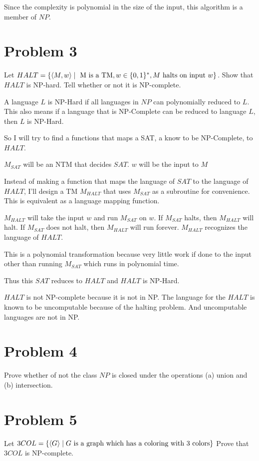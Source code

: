 \documentclass[12pt]{article}
\begin{document}
Since the complexity is polynomial in the size of the input, this algorithm is a member of $NP$.


\section*{Problem 3}
\begin{questionbox}
	Let $HALT = \{ \braket{M, w} \mid \text{ M is a TM}, w \in \{0,1\}^*, M \text { halts on input } w  \}$. Show that $HALT$ is NP-hard. Tell whether or not it is NP-complete.
\end{questionbox}

A language $L$ is NP-Hard if all languages in $NP$ can polynomially reduced to $L$.
This also means if a language that is NP-Complete can be reduced to language $L$, then $L$ is NP-Hard.

So I will try to find a functions that maps a SAT, a know to be NP-Complete, to $HALT$.

$M_{SAT}$ will be an NTM that decides $SAT$. $w$ will be the input to $M$

Instead of making a function that maps the language of $SAT$ to the language of $HALT$, I'll design a TM $M_{HALT}$ that uses $M_{SAT}$ as a subroutine for convenience. This is equivalent as a language mapping function.

$M_{HALT}$ will take the input $w$ and run $M_{SAT}$ on $w$. If $M_{SAT}$ halts, then $M_{HALT}$ will halt. If $M_{SAT}$ does not halt, then $M_{HALT}$ will run forever. $M_{HALT}$ recognizes the language of $HALT$.

This is a polynomial transformation because very little work if done to the input other than running $M_{SAT}$ which runs in polynomial time.

Thus this $SAT$ reduces to $HALT$ and $HALT$ is NP-Hard.

$HALT$ is not NP-complete because it is not in NP. The language for the $HALT$ is known to be uncomputable because of the halting problem. And uncomputable languages are not in NP.


\section*{Problem 4}

\begin{questionbox}
		Prove whether of not the class $NP$ is closed under the operations (a) union and (b) intersection.
\end{questionbox}

\section*{Problem 5}

\begin{questionbox}
	Let $3COL = \{\braket{G} \mid G \text{ is a graph which has a coloring with 3 colors} \}$ Prove that $3COL$ is
NP-complete.
\end{questionbox}
\end{document}
